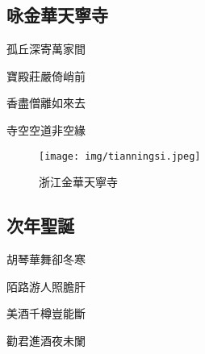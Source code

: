 \documentclass[a4j,12pt]{ltjtarticle}
\begin{document}
\begin{center}
	
	\newpage

	\begin{flushleft}
		\section{咏金華天寧寺}
	\end{flushleft}

	\vfill
		\LARGE 孤丘深寄萬家間\par
		寶殿莊嚴倚峭前\par
		香盡僧離如來去\par
		寺空空道非空緣\par
		\vspace{1.5cm} %
	\vfill

	
	\newpage
	\vfill
	\begin{figure}[h!]
		\centering
		\texttt{[image: img/tianningsi.jpeg]}
		\caption{浙江金華天寧寺}
		\label{fig:tianningsi}
	\end{figure}
	\vfill


	\begin{flushleft}
		\section{次年聖誕}
	\end{flushleft}

	\vfill
		\LARGE 胡琴華舞卻冬寒\par
		陌路游人照膽肝\par
		美酒千樽豈能斷\par
		勸君進酒夜未闌\par
		\vspace{1.5cm} %
	\vfill

	

	\end{center}


	
\end{document}
